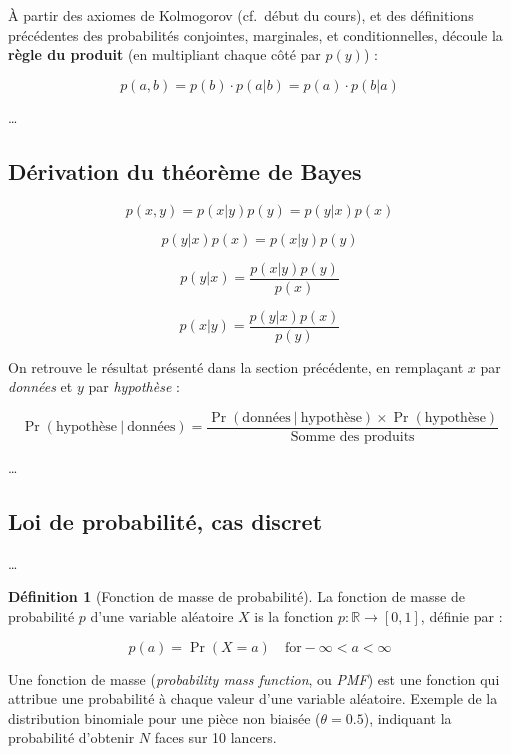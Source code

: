 \documentclass[
  a4paper,11pt,twoside,onecolumn,openright,final,oldfontcommands]{memoir}
\theoremstyle{definition}
\newtheorem{definition}{Définition}[chapter]
\theoremstyle{definition}
\theoremstyle{definition}
\theoremstyle{definition}
\theoremstyle{remark}
\begin{document}
À partir des axiomes de Kolmogorov (cf.~début du cours), et des définitions précédentes des probabilités conjointes, marginales, et conditionnelles, découle la \textbf{règle du produit} (en multipliant chaque côté par \(p(y)\)) :

\[p(a, b) = p(b) \cdot p(a|b) = p(a) \cdot p(b|a)\]

\ldots{}

\hypertarget{duxe9rivation-du-thuxe9oruxe8me-de-bayes}{%
\subsection{Dérivation du théorème de Bayes}\label{duxe9rivation-du-thuxe9oruxe8me-de-bayes}}

\[p(x, y) = p(x|y) p(y) = p(y|x)p(x)\]

\[p(y|x)p(x) = p(x|y)p(y)\]

\[p(y|x) = \dfrac{p(x|y)p(y)}{p(x)}\]

\[p(x|y) = \dfrac{p(y|x)p(x)}{p(y)}\]

On retrouve le résultat présenté dans la section précédente, en remplaçant \(x\) par \emph{données} et \(y\) par \emph{hypothèse} :

\[
\Pr(\text{hypothèse} \ | \ \text{données}) = \frac{\Pr(\text{données} \ | \ \text{hypothèse}) \times \Pr(\text{hypothèse})}{\text{Somme des produits}}
\]

\ldots{}

\hypertarget{loi-de-probabilituxe9-cas-discret}{%
\subsection{Loi de probabilité, cas discret}\label{loi-de-probabilituxe9-cas-discret}}

\ldots{}

\begin{definition}[Fonction de masse de probabilité]
\protect\hypertarget{def:PMF}{}\label{def:PMF}La fonction de masse de probabilité \(p\) d'une variable aléatoire \(X\) is la fonction \(p : \mathbb{R} \rightarrow [0, 1]\), définie par :

\[p(a) = \Pr(X = a) \quad \text{for} - \infty < a < \infty\]
\end{definition}

Une fonction de masse (\emph{probability mass function}, ou \emph{PMF}) est une fonction qui attribue une probabilité à chaque valeur d'une variable aléatoire. Exemple de la distribution binomiale pour une pièce non biaisée (\(\theta = 0.5\)), indiquant la probabilité d'obtenir \(N\) faces sur 10 lancers.
\end{document}
